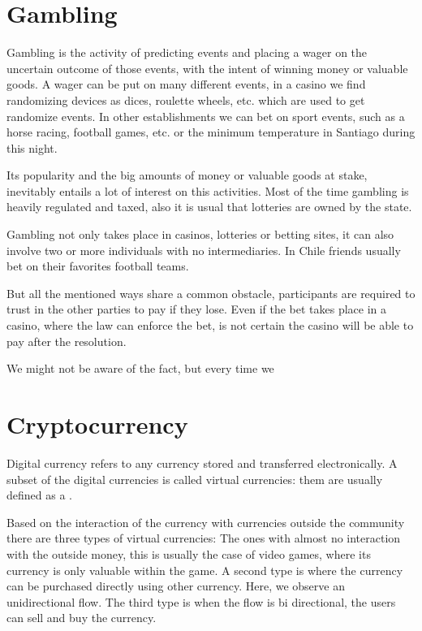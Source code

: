 \begin{intro}
\section{Gambling}
Gambling is the activity of predicting events and placing a wager on the
  uncertain outcome of those events, with the intent of winning money or
  valuable goods.
A wager can be put on many different events, in a casino we find randomizing
  devices as dices, roulette wheels, etc. which are used to get randomize
  events. In other establishments we can bet on sport events, such as a horse
  racing, football games, etc. or the minimum temperature in Santiago during
  this night.
  
Its popularity and the big amounts of money or valuable goods at stake,
  inevitably entails a lot of interest on this activities. Most of the time
  gambling is heavily regulated and taxed, also it is usual that lotteries are
  owned by the state.

Gambling not only takes place in casinos, lotteries or betting sites, it can
  also involve two or more individuals with no intermediaries. In Chile
  friends usually bet on their favorites football teams.
  
  But all the mentioned ways share a common obstacle, participants are required
  to trust in the other parties to pay if they lose.
  Even if the bet takes place in a casino, where the law can enforce the bet,
  is not certain the casino will be able to pay after the resolution.
  
We might not be aware of the fact, but every time we 
  
\section{Cryptocurrency}
Digital currency refers to any currency stored and transferred
  electronically.
  A subset of the digital currencies is called virtual currencies: them are
  usually defined as a .
  
Based on the interaction of the currency with currencies outside the
  community there are three types of virtual currencies: The ones with almost
  no interaction with the outside money, this is usually the case of video
  games, where its currency is only valuable within the game. A second
  type is where the currency can be purchased directly using other currency.
  Here, we observe an unidirectional flow. The third type is when the flow is
  bi directional, the users can sell and buy the currency. 
  

\end{intro}
